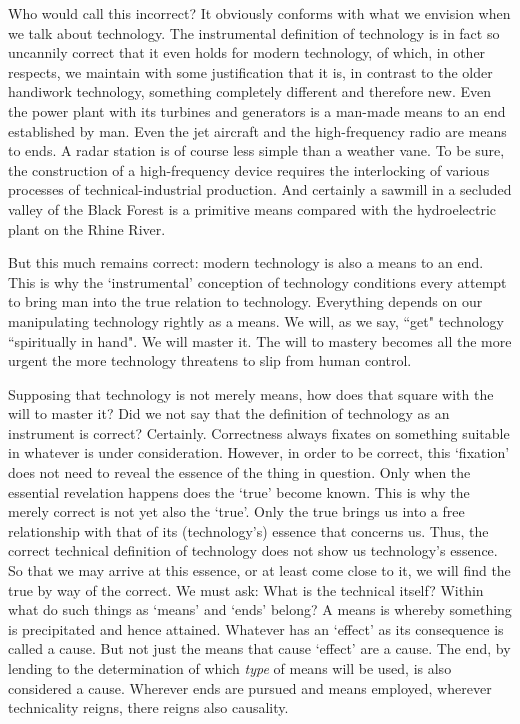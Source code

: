 \documentclass[paper=a4, fontsize=11pt,twoside]{scrartcl}
\begin{document}
Who would call this incorrect? It obviously conforms with what we envision when we talk about technology. The instrumental definition of technology is in fact so uncannily correct that it even holds for modern technology, of which, in other respects, we maintain with some justification that it is, in contrast to the older handiwork technology, something completely different and therefore new. Even the power plant with its turbines and generators is a man-made means to an end established by man. Even the jet aircraft and the high-frequency radio are means to ends. A radar station is of course less simple than a weather vane. To be sure, the construction of a high-frequency device requires the interlocking of various processes of technical-industrial production. And certainly a sawmill in a secluded valley of the Black Forest is a primitive means compared with the hydroelectric plant on the Rhine River.

But this much remains correct: modern technology is also a means to an end. This is why the `instrumental' conception of technology conditions every attempt to bring man into the true relation to technology. Everything depends on our manipulating technology rightly as a means. We will, as we say, ``get" technology ``spiritually in hand". We will master it. The will to mastery becomes all the more urgent the more technology threatens to slip from human control.

Supposing that technology is not merely means, how does that square with the will to master it? Did we not say that the definition of technology as an instrument is correct? Certainly. Correctness always fixates on something suitable in whatever is under consideration. However, in order to be correct, this `fixation' does not need to reveal the essence of the thing in question. Only when the essential revelation happens does the `true' become known. This is why the merely correct is not yet also the `true'. Only the true brings us into a free relationship with that of its (technology's) essence that concerns us. Thus, the correct technical definition of technology does not show us technology's essence. So that we may arrive at this essence, or at least come close to it, we will find the true by way of the correct. We must ask: What is the technical itself? Within what do such things as `means' and `ends' belong? A means is whereby something is precipitated and hence attained. Whatever has an `effect' as its consequence is called a cause. But not just the means that cause `effect' are a cause. The end, by lending to the determination of which \textit{type} of means will be used, is also considered a cause. Wherever ends are pursued and means employed, wherever technicality reigns, there reigns also causality.
\end{document}

